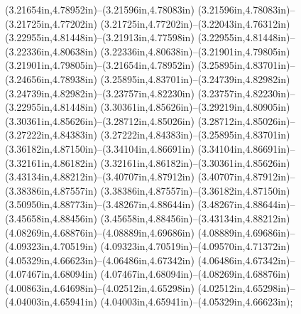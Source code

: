 (3.21654in,4.78952in)--(3.21596in,4.78083in) (3.21596in,4.78083in)--(3.21725in,4.77202in) (3.21725in,4.77202in)--(3.22043in,4.76312in) (3.22955in,4.81448in)--(3.21913in,4.77598in) (3.22955in,4.81448in)--(3.22336in,4.80638in) (3.22336in,4.80638in)--(3.21901in,4.79805in) (3.21901in,4.79805in)--(3.21654in,4.78952in) (3.25895in,4.83701in)--(3.24656in,4.78938in) (3.25895in,4.83701in)--(3.24739in,4.82982in) (3.24739in,4.82982in)--(3.23757in,4.82230in) (3.23757in,4.82230in)--(3.22955in,4.81448in) (3.30361in,4.85626in)--(3.29219in,4.80905in) (3.30361in,4.85626in)--(3.28712in,4.85026in) (3.28712in,4.85026in)--(3.27222in,4.84383in) (3.27222in,4.84383in)--(3.25895in,4.83701in) (3.36182in,4.87150in)--(3.34104in,4.86691in) (3.34104in,4.86691in)--(3.32161in,4.86182in) (3.32161in,4.86182in)--(3.30361in,4.85626in) (3.43134in,4.88212in)--(3.40707in,4.87912in) (3.40707in,4.87912in)--(3.38386in,4.87557in) (3.38386in,4.87557in)--(3.36182in,4.87150in) (3.50950in,4.88773in)--(3.48267in,4.88644in) (3.48267in,4.88644in)--(3.45658in,4.88456in) (3.45658in,4.88456in)--(3.43134in,4.88212in) (4.08269in,4.68876in)--(4.08889in,4.69686in) (4.08889in,4.69686in)--(4.09323in,4.70519in) (4.09323in,4.70519in)--(4.09570in,4.71372in) (4.05329in,4.66623in)--(4.06486in,4.67342in) (4.06486in,4.67342in)--(4.07467in,4.68094in) (4.07467in,4.68094in)--(4.08269in,4.68876in) (4.00863in,4.64698in)--(4.02512in,4.65298in) (4.02512in,4.65298in)--(4.04003in,4.65941in) (4.04003in,4.65941in)--(4.05329in,4.66623in);
